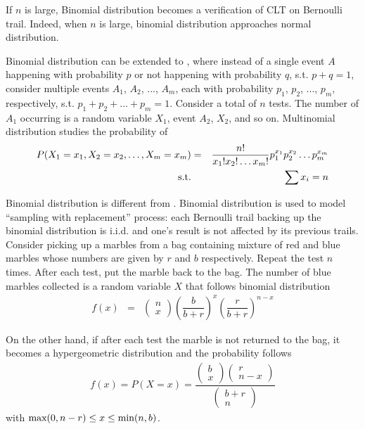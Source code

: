 If $n$ is large, Binomial distribution becomes a verification of CLT on Bernoulli trail. Indeed, when $n$ is large, binomial distribution approaches normal distribution.

Binomial distribution can be extended to , where instead of a single event $A$ happening with probability $p$ or not happening with probability $q$, s.t. $p+q=1$, consider multiple events $A_1$, $A_2$, ..., $A_m$, each with probability $p_1$, $p_2$, ..., $p_m$, respectively, s.t. $p_1+p_2+\ldots+p_m=1$. Consider a total of $n$ tests. The number of $A_1$ occurring is a random variable $X_1$, event $A_2$, $X_2$, and so on. Multinomial distribution studies the probability of
\begin{eqnarray}
	P(X_1=x_1, X_2=x_2,\ldots, X_m = x_m) &=& \dfrac{n!}{x_1!x_2!\ldots x_m!}p_1^{x_1}p_2^{x_2}\ldots p_m^{x_m} \nonumber \\
	\textup{s.t.} && \sum x_i = n \nonumber
\end{eqnarray}

Binomial distribution is different from . Binomial distribution is used to model ``sampling with replacement'' process: each Bernoulli trail backing up the binomial distribution is i.i.d. and one's result is not affected by its previous trails. Consider picking up a marbles from a bag containing mixture of red and blue marbles whose numbers are given by $r$ and $b$ respectively. Repeat the test $n$ times. After each test, put the marble back to the bag. The number of blue marbles collected is a random variable $X$ that follows binomial distribution
\begin{eqnarray}
	f(x) &=& \left(\begin{array}{c}
		n \\
		x
	\end{array}\right)\left(\dfrac{b}{b+r}\right)^x\left(\dfrac{r}{b+r}\right)^{n-x} \nonumber \nonumber
\end{eqnarray}

On the other hand, if after each test the marble is not returned to the bag, it becomes a hypergeometric distribution and the probability follows
\begin{eqnarray}
	f(x) = P(X=x) = \dfrac{\left(\begin{array}{c}
			b \\
			x
		\end{array}\right)\left(\begin{array}{c}
			r \\
			n-x
		\end{array}\right)}{\left(\begin{array}{c}
			b+r \\
			n
		\end{array}\right)} \nonumber
\end{eqnarray}
with $\textup{max}(0, n-r) \leq x \leq \textup{min}(n, b)$.

